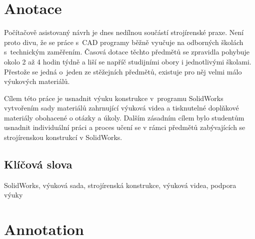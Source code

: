 \documentclass{template/socthesis}
\author{Petr Štourač}
\begin{document}

\maketitle



\makethanks{\B{\textcolor{red}{PŠ: Poděkování sepísnu na závěr.}}}

\pagestyle{empty}

\section*{Anotace}
Počítačově asistovaný návrh je dnes nedílnou součástí strojírenské praxe.
Není proto divu, že se práce s~CAD programy běžně vyučuje na odborných školách s~technickým zaměřením.
Časová dotace těchto předmětů se zpravidla pohybuje okolo 2 až 4 hodin týdně a liší se napříč studijními obory i jednotlivými školami.
Přestože se jedná o~jeden ze stěžejních předmětů, existuje pro něj velmi málo výukových materiálů.

Cílem této práce je usnadnit výuku konstrukce v~programu SolidWorks vytvořením sady materiálů zahrnující výuková videa a tisknutelné doplňkové materiály obohacené o otázky a úkoly.
Dalším zásadním cílem bylo studentům usnadnit individuální práci a proces učení se v rámci předmětů zabývajících se strojírenskou konstrukcí v SolidWorks. 

\subsection*{Klíčová slova}
SolidWorks, výuková sada, strojírenská konstrukce, výuková videa, podpora výuky

\vspace{20mm}

\section*{Annotation}
\B{\textcolor{red}{PŠ: Anotaci ještě přeložím, nicméně je to asi ta poslední věc na které teď záleží :-)}}
\end{document}
